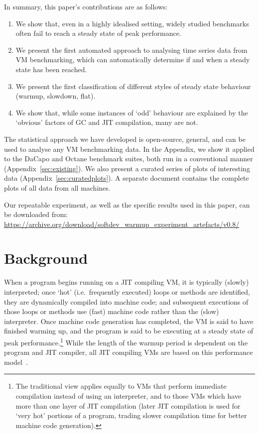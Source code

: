 \documentclass[acmsmall,screen]{acmart}
\begin{document}
In summary, this paper's contributions are as follows:
\begin{enumerate}
    \item We show that, even in a highly idealised setting, widely studied benchmarks
often fail to reach a steady state of peak performance.
    \item We present the first automated approach to analysing time series
data from VM benchmarking, which can automatically determine if and when a steady
state has been reached.
    \item We present the first classification of different styles of
steady state behaviour (warmup, slowdown, flat).
    \item We show that, while some instances of `odd' behaviour are explained by
the `obvious' factors of GC and JIT compilation, many are not.
\end{enumerate}

The statistical approach we have developed is open-source, general, and can be used
to analyse any VM benchmarking data. In the Appendix, we show it applied
to the DaCapo and Octane benchmark suites,
both run in a conventional manner (Appendix~\ref{sec:existing}). We also present a curated
series of plots of interesting data (Appendix~\ref{sec:curatedplots}). A
separate document contains the complete plots of all data from all machines.

Our repeatable experiment, as well as the specific results used
in this paper, can be downloaded from:
\url{https://archive.org/download/softdev_warmup_experiment_artefacts/v0.8/}


\section{Background}
\label{sec:warmup}

When a program begins running on a JIT compiling VM, it is typically (slowly)
interpreted; once `hot' (i.e.~frequently executed) loops or methods are
identified, they are dynamically compiled into machine code; and subsequent
executions of those loops or methods use (fast) machine code rather than the
(slow) interpreter. Once machine code generation has completed, the VM is
said to have finished warming up, and the program is said to be executing
at a steady state of peak performance.\footnote{The traditional view applies equally to VMs
that perform immediate compilation instead of using an interpreter, and to
those VMs which have more than one layer of JIT compilation (later JIT
compilation is used for `very hot' portions of a program, trading slower
compilation time for better machine code generation).}
While the length of the warmup period
is dependent on the program and JIT compiler, all JIT compiling
VMs are based on this performance model~\cite{kalibera13rigorous}.
\end{document}
